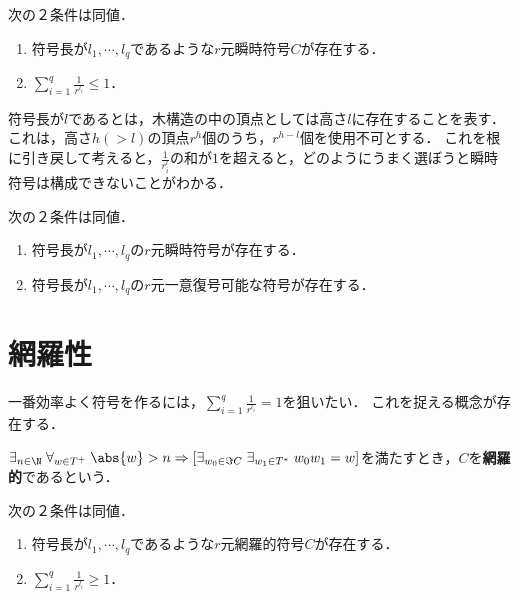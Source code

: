 \documentclass[uplatex,dvipdfmx]{jsreport}
\begin{document}
\begin{theorem}[Kraft 49]
    次の２条件は同値．
    \begin{enumerate}
        \item 符号長が$l_1,\cdots,l_q$であるような$r$元瞬時符号$C$が存在する．
        \item $\sum^q_{i=1}\frac{1}{r^{l_i}}\le 1$．
    \end{enumerate}
\end{theorem}
\begin{remarks}
    符号長が$l$であるとは，木構造の中の頂点としては高さ$l$に存在することを表す．
    これは，高さ$h(>l)$の頂点$r^h$個のうち，$r^{h-l}$個を使用不可とする．
    これを根に引き戻して考えると，$\frac{1}{r^l_i}$の和が$1$を超えると，どのようにうまく選ぼうと瞬時符号は構成できないことがわかる．
\end{remarks}

\begin{corollary}\mbox{}
    次の２条件は同値．
    \begin{enumerate}
        \item 符号長が$l_1,\cdots,l_q$の$r$元瞬時符号が存在する．
        \item 符号長が$l_1,\cdots,l_q$の$r$元一意復号可能な符号が存在する．
    \end{enumerate}
\end{corollary}

\section{網羅性}

\begin{tcolorbox}[colframe=ForestGreen, colback=ForestGreen!10!white,breakable,colbacktitle=ForestGreen!40!white,coltitle=black,fonttitle=\bfseries\sffamily,
title=]
    一番効率よく符号を作るには，$\sum^q_{i=1}\frac{1}{r^{l_i}}= 1$を狙いたい．
    これを捉える概念が存在する．
\end{tcolorbox}

\begin{definition}[exhaustive]
    $\exists_{n\in\N}\;\forall_{w\in T^+}\;\abs{w}>n\Rightarrow[\exists_{w_0\in\Im C}\;\exists_{w_1\in T^*}\;w_0w_1=w]$を満たすとき，$C$を\textbf{網羅的}であるという．
\end{definition}

\begin{theorem}
    次の２条件は同値．
    \begin{enumerate}
        \item 符号長が$l_1,\cdots,l_q$であるような$r$元網羅的符号$C$が存在する．
        \item $\sum^q_{i=1}\frac{1}{r^{l_i}}\ge 1$．
    \end{enumerate}
\end{theorem}
\end{document}
